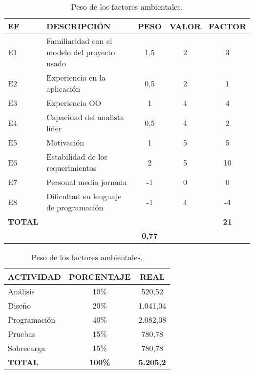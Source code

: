 \begin{table}[!hb]
\begin{center}
\begin{tabular}{l l c c c}
\textbf{EF} & \textbf{DESCRIPCIÓN} & \textbf{PESO} & \textbf{VALOR} & \textbf{FACTOR}\\ \hline \hline
E1	&	Familiaridad con el modelo del proyecto usado	&	1,5	&	2	&	3	\\
E2	&	Experiencia en la aplicación	&	0,5	&	2	&	1	\\
E3	&	Experiencia OO	&	1	&	4	&	4	\\
E4	&	Capacidad del analista líder	&	0,5	&	4	&	2	\\
E5	&	Motivación	&	1	&	5	&	5	\\
E6	&	Estabilidad de los requerimientos	&	2	&	5	&	10	\\
E7	&	Personal media jornada	&	-1	&	0	&	0	\\
E8	&	Dificultad en lenguaje de programación	&	-1	&	4	&	-4	\\ \hline
\textbf{TOTAL} & & & & \textbf{21}\\ \hline \hline
\multicolumn{2}{l}{}\textbf{Factores ambientales} & \textbf{0,77} & & \\ \hline \hline
\end{tabular}
\caption{Peso de los factores ambientales.}
\label{tab:ef}
\end{center}
\end{table}

\begin{table}[!hb]
\begin{center}
\begin{tabular}{l c c}
\textbf{ACTIVIDAD} & \textbf{PORCENTAJE} & \textbf{REAL}\\ \hline \hline
Análisis & 10\% & 520,52 \\
Diseño & 20\% & 1.041,04 \\
Programación & 40\% & 2.082,08 \\
Pruebas & 15\% & 780,78 \\
Sobrecarga & 15\% & 780,78 \\ \hline
\textbf{TOTAL} & \textbf{100\%} & \textbf{5.205,2}\\ \hline \hline
\end{tabular}
\caption{Peso de los factores ambientales.}
\label{tab:porcentajeAct}
\end{center}
\end{table}



